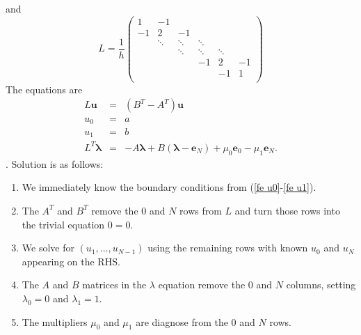 \documentclass{article}
\def\MM#1{\boldsymbol{#1}}
\begin{document}
and
\[
L=
\frac{1}{h}
\begin{pmatrix}
1 & -1 &        &      & & \\
-1 & 2 & -1  &      & & \\
 & \ddots & \ddots & \ddots & & \\
 & & \ddots & \ddots & \ddots & \\
 & &        & -1 & 2 & -1 \\
 & &        &        & -1     & 1 \\
\end{pmatrix}
\]
The equations are
\begin{eqnarray}
\label{fe u eqn}
L\MM{u} & = & (B^T-A^T)\MM{u} \\
\label{fe u0}
u_0 & = & a\\
\label{fe u1}
u_1 & = & b\\
\label{fe lambda}
L^T\MM{\lambda} & = & -A\MM{\lambda} + B(\MM{\lambda}-\MM{e}_N)
+ \mu_0\MM{e}_0 - \mu_1\MM{e}_N.
\end{eqnarray}.
Solution is as follows:
\begin{enumerate}
\item We immediately know the boundary conditions from (\ref{fe
  u0}-\ref{fe u1}).
\item The $A^T$ and $B^T$ remove the $0$ and $N$ rows from $L$ and
  turn those rows into the trivial equation $0=0$.
\item We solve for $(u_1,\ldots,u_{N-1})$ using the remaining rows
  with known $u_0$ and $u_N$ appearing on the RHS.
\item The $A$ and $B$ matrices in the $\lambda$ equation remove the
  $0$ and $N$ columns, setting $\lambda_0=0$ and $\lambda_1=1$.
\item The multipliers $\mu_0$ and $\mu_1$ are diagnose from the 0 and
  $N$ rows.
\end{enumerate}
\end{document}
